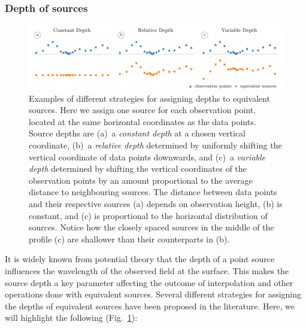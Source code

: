 \documentclass[twocolumn]{article}
\begin{document}
\subsubsection{Depth of sources}

\begin{figure}
    \includegraphics[width=\linewidth]{figs/depth_types.pdf}
    \caption{
        Examples of different strategies for assigning depths to equivalent
        sources.
        Here we assign one source for each
        observation point, located at the same horizontal coordinates as the
        data points.
        Source depths are
        (a)~a \emph{constant depth} at a chosen vertical coordinate,
        (b)~a \emph{relative depth} determined by uniformly shifting the
        vertical coordinate of data points downwards,
        and
        (c)~a \emph{variable depth} determined by shifting the vertical
        coordinates of the observation points by an amount proportional to the
        average distance to neighbouring sources.
        The distance between data points and their respective sources (a)
        depends on observation height, (b) is constant, and (c) is proportional
        to the horizontal distribution of sources.
        Notice how the closely spaced sources in the middle of the profile (c)
        are shallower than their counterparts in (b).
    }
    \label{fig:depth_types}
\end{figure}

It is widely known from potential theory that the depth of a point source
influences the wavelength of the observed field at the surface.
This makes the source depth a key parameter affecting the outcome of
interpolation and other operations done with equivalent sources.
Several different strategies for assigning the depths of equivalent sources
have been proposed in the literature.
Here, we will highlight the following (Fig.~\ref{fig:depth_types}):
\end{document}
